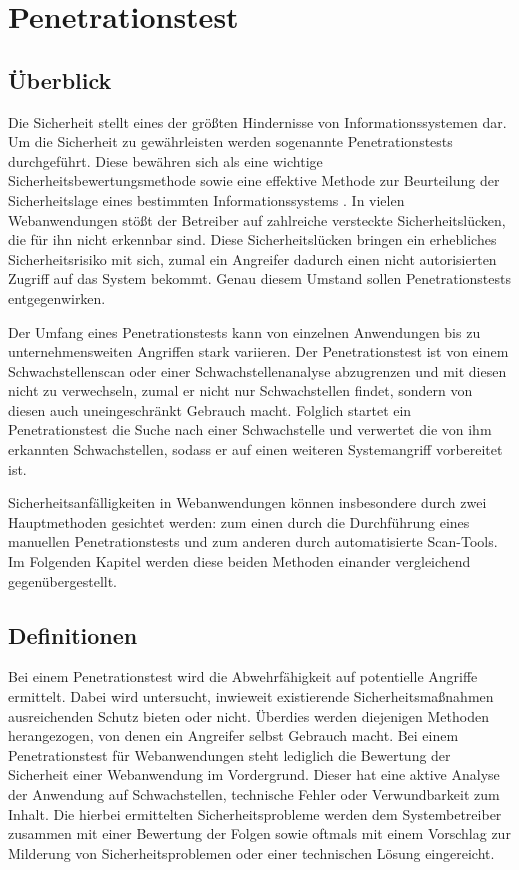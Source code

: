 \chapter{Penetrationstest}
\label{cha:k4}

\section{Überblick}

Die Sicherheit stellt eines der größten Hindernisse von Informationssystemen dar. Um die Sicherheit zu gewährleisten werden sogenannte Penetrationstests durchgeführt. Diese bewähren sich als eine wichtige Sicherheitsbewertungsmethode sowie eine effektive Methode zur Beurteilung der Sicherheitslage eines bestimmten Informationssystems . In vielen Webanwendungen stößt der Betreiber auf zahlreiche versteckte Sicherheitslücken, die für  ihn nicht erkennbar sind. Diese Sicherheitslücken bringen ein erhebliches Sicherheitsrisiko mit sich, zumal ein Angreifer dadurch einen nicht autorisierten Zugriff auf das System bekommt. Genau diesem Umstand sollen Penetrationstests entgegenwirken.

Der Umfang eines Penetrationstests kann von einzelnen Anwendungen bis zu unternehmensweiten Angriffen stark variieren. Der Penetrationstest ist von einem Schwachstellenscan oder einer Schwachstellenanalyse abzugrenzen und mit diesen nicht zu verwechseln, zumal er nicht nur Schwachstellen findet, sondern von diesen auch uneingeschränkt Gebrauch macht. Folglich startet ein Penetrationstest die Suche nach einer Schwachstelle und verwertet die von ihm erkannten Schwachstellen, sodass er auf einen weiteren Systemangriff vorbereitet ist\cite{northcutt2006}.

Sicherheitsanfälligkeiten in Webanwendungen können insbesondere durch zwei Hauptmethoden gesichtet werden: zum einen durch die Durchführung eines manuellen Penetrationstests und zum anderen durch automatisierte Scan-Tools. Im Folgenden Kapitel werden diese beiden Methoden einander vergleichend gegenübergestellt.

\section{Definitionen}

Bei einem Penetrationstest wird die Abwehrfähigkeit auf potentielle Angriffe ermittelt. Dabei wird untersucht, inwieweit existierende Sicherheitsmaßnahmen ausreichenden Schutz bieten oder nicht. Überdies werden diejenigen Methoden herangezogen, von denen  ein Angreifer selbst Gebrauch macht\cite[5--6]{pt03bsi}. Bei einem Penetrationstest für Webanwendungen steht lediglich die Bewertung der Sicherheit einer Webanwendung im Vordergrund. Dieser hat eine aktive Analyse der Anwendung auf Schwachstellen, technische Fehler oder Verwundbarkeit zum Inhalt. Die hierbei ermittelten Sicherheitsprobleme werden dem Systembetreiber zusammen mit einer Bewertung der Folgen sowie oftmals mit einem Vorschlag zur Milderung von Sicherheitsproblemen oder einer technischen Lösung eingereicht\cite[46]{meucci2008owasp}.

